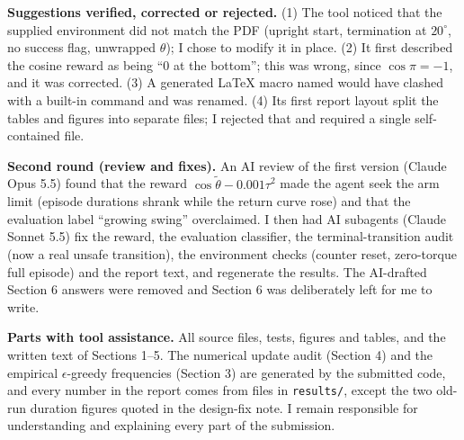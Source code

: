 \documentclass[11pt]{article}
\begin{document}
\textbf{Suggestions verified, corrected or rejected.} (1) The tool noticed that the supplied environment did not match the PDF (upright start, termination at $20^\circ$, no success flag, unwrapped $\theta$); I chose to modify it in place. (2) It first described the cosine reward as being ``0 at the bottom''; this was wrong, since $\cos\pi=-1$, and it was corrected. (3) A generated LaTeX macro named \texttt{\string\alpha} would have clashed with a built-in command and was renamed. (4) Its first report layout split the tables and figures into separate files; I rejected that and required a single self-contained file.

\textbf{Second round (review and fixes).} An AI review of the first version (Claude Opus 5.5) found that the reward $\cos\widetilde\theta-0.001\tau^2$ made the agent seek the arm limit (episode durations shrank while the return curve rose) and that the evaluation label ``growing swing'' overclaimed. I then had AI subagents (Claude Sonnet 5.5) fix the reward, the evaluation classifier, the terminal-transition audit (now a real unsafe transition), the environment checks (counter reset, zero-torque full episode) and the report text, and regenerate the results. The AI-drafted Section 6 answers were removed and Section 6 was deliberately left for me to write.

\textbf{Parts with tool assistance.} All source files, tests, figures and tables, and the written text of Sections 1--5. The numerical update audit (Section 4) and the empirical $\epsilon$-greedy frequencies (Section 3) are generated by the submitted code, and every number in the report comes from files in \texttt{results/}, except the two old-run duration figures quoted in the design-fix note. I remain responsible for understanding and explaining every part of the submission.
\end{document}
